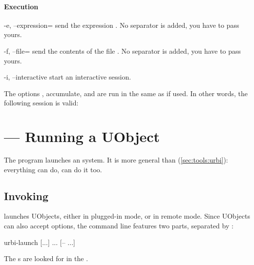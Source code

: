 \paragraph{Execution}
\begin{options}
\item[-e, --expression=\var{exp}] send the \us expression .
  No separator is added, you have to pass yours.
\item[-f, --file=\var{file}] send the contents of the file .
  No separator is added, you have to pass yours.
\item[-i, --interactive] start an interactive session.
\end{options}

The options ,  accumulate, and are run in the
same  as  if used.  In other words, the
following session is valid:


\section{ --- Running a UObject}
\label{sec:tools:urbi-launch}

The  program launches an \urbi system.  It is
more general than  (\autoref{sec:tools:urbi}):
everything  can do,  can do it too.

\subsection{Invoking }

 launches UObjects, either in plugged-in mode, or
in remote mode.  Since UObjects can also accept options, the command
line features two parts, separated by \samp{--}:

\begin{shell}
urbi-launch [...] ... [-- ...]
\end{shell}

The s are looked for in the .


